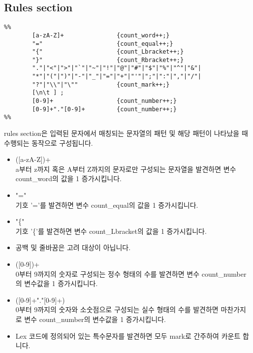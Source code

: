 \documentclass{article}
\begin{document}
\subsection{Rules section}
\begin{lstlisting}
%%
        [a-zA-Z]+               {count_word++;}
        "="                     {count_equal++;}
        "{"                     {count_Lbracket++;}
        "}"                     {count_Rbracket++;}
        "."|"<"|">"|"`"|"~"|"!"|"@"|"#"|"$"|"%"|"^"|"&"|
        "*"|"("|")"|"-"|"_"|"="|"+"|"'"|";"|":"|","|"/"|
        "?"|"\\"|"\""           {count_mark++;}
        [\n\t ] ;
        [0-9]+                  {count_number++;}
        [0-9]+"."[0-9]+         {count_number++;}
%%
\end{lstlisting}
\par
rules section은 입력된 문자에서 매칭되는 문자열의 패턴 및 해당 패턴이 나타났을 때 수행되는 동작으로 구성됩니다.\\

\begin{center}
\begin{itemize}
    \item ([a-zA-Z])+  \\ a부터 z까지 혹은 A부터 Z까지의 문자로만 구성되는 문자열을 발견하면 변수 count\_word의 값을 1 증가시킵니다.\\
    \item "=" \\ 기호 '='를 발견하면 변수 count\_equal의 값을 1 증가시킵니다.\\
    \item "\{" \\ 기호 '\{'를 발견하면 변수 count\_Lbracket의 값을 1 증가시킵니다.
    \item 공백 및 줄바꿈은 고려 대상이 아닙니다.\\
    \item ([0-9])+ \\ 0부터 9까지의 숫자로 구성되는 정수 형태의 수를 발견하면 변수 count\_number의 변수값을 1 증가시킵니다.\\
    \item ([0-9]+"."[0-9]+) \\ 0부터 9까지의 숫자와 소숫점으로 구성되는 실수 형태의 수를 발견하면 마찬가지로 변수 count\_number의 변수값을 1 증가시킵니다. \\
    \item Lex 코드에 정의되어 있는 특수문자를 발견하면 모두 mark로 간주하여 카운트 합니다.\\
\end{itemize}
\end{center}
\end{document}

